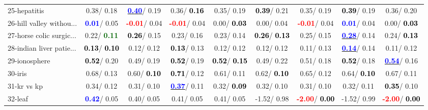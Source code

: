 \begin{table}[h]
\begin{center}
\begin{tabular}{lc|c|c|c|c|c|c|c}
25-hepatitis &   0.38/  0.18 & \underline{\textcolor{blue}{\textbf{  0.40}}}/  0.19 &   0.36/\textcolor{black}{\textbf{  0.16}} &   0.35/  0.19 & \textcolor{black}{\textbf{  0.39}}/  0.21 &   0.35/  0.19 & \textcolor{black}{\textbf{  0.39}}/  0.19 &   0.36/  0.20 \\
26-hill valley withou... & \textcolor{blue}{\textbf{  0.01}}/  0.05 & \textcolor{red}{\textbf{ -0.01}}/  0.04 & \textcolor{red}{\textbf{ -0.01}}/  0.04 &   0.00/\textcolor{black}{\textbf{  0.03}} &   0.00/  0.04 & \textcolor{red}{\textbf{ -0.01}}/  0.04 & \textcolor{blue}{\textbf{  0.01}}/  0.04 &   0.00/\textcolor{black}{\textbf{  0.03}} \\
27-horse colic surgic... &   0.22/\textcolor{darkgreen}{\textbf{  0.11}} & \textcolor{black}{\textbf{  0.26}}/  0.15 &   0.23/  0.16 &   0.23/  0.14 & \textcolor{black}{\textbf{  0.26}}/\textcolor{black}{\textbf{  0.13}} &   0.25/  0.15 & \underline{\textcolor{blue}{\textbf{  0.28}}}/  0.14 &   0.24/\textcolor{black}{\textbf{  0.13}} \\
28-indian liver patie... & \textcolor{black}{\textbf{  0.13}}/\textcolor{black}{\textbf{  0.10}} &   0.12/  0.12 & \textcolor{black}{\textbf{  0.13}}/  0.13 &   0.12/  0.12 &   0.12/  0.12 &   0.11/  0.13 & \underline{\textcolor{blue}{\textbf{  0.14}}}/  0.14 &   0.11/  0.12 \\ \hline
29-ionosphere & \textcolor{black}{\textbf{  0.52}}/  0.20 &   0.49/  0.19 & \textcolor{black}{\textbf{  0.52}}/  0.19 & \textcolor{black}{\textbf{  0.52}}/\textcolor{black}{\textbf{  0.15}} &   0.49/  0.22 &   0.51/  0.18 & \textcolor{black}{\textbf{  0.52}}/  0.18 & \underline{\textcolor{blue}{\textbf{  0.54}}}/  0.16 \\
30-iris &   0.68/  0.13 &   0.60/\textcolor{black}{\textbf{  0.10}} & \textcolor{black}{\textbf{  0.71}}/  0.12 &   0.61/  0.11 &   0.62/\textcolor{black}{\textbf{  0.10}} &   0.65/  0.12 &   0.64/\textcolor{black}{\textbf{  0.10}} &   0.67/  0.11 \\
31-kr vs kp &   0.34/  0.12 &   0.31/  0.10 & \underline{\textcolor{blue}{\textbf{  0.37}}}/  0.11 &   0.32/\textcolor{black}{\textbf{  0.09}} &   0.32/  0.10 &   0.31/  0.10 &   0.32/  0.11 & \textcolor{black}{\textbf{  0.35}}/  0.10 \\
32-leaf & \textcolor{blue}{\textbf{  0.42}}/  0.05 &   0.40/  0.05 &   0.41/  0.05 &   0.41/  0.05 &  -1.52/  0.98 & \textcolor{red}{\textbf{ -2.00}}/\textcolor{black}{\textbf{  0.00}} &  -1.52/  0.99 & \textcolor{red}{\textbf{ -2.00}}/\textcolor{black}{\textbf{  0.00}} \\\end{tabular}\label{stratsALCKappa0bCIELM}
\end{center}
\end{table}
